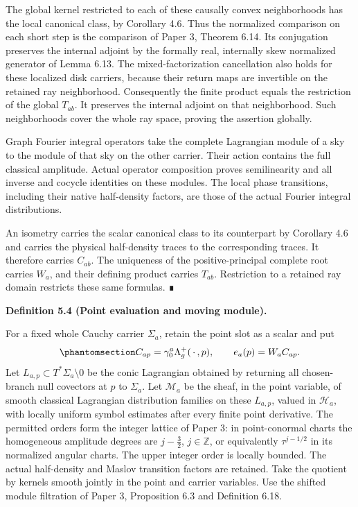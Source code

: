\documentclass[
  english,
  11pt,
  reqno]{amsart}
\makeatletter
\newcommand{\pandocstatementheading}[1]{%
  \par\addpenalty{\@beginparpenalty}%
  \addvspace{.5\baselineskip plus .2\baselineskip minus .2\baselineskip}%
  {\normalfont\bfseries #1\par}%
  \nobreak\@afterindenttrue\@afterheading
}
\makeatother
\begin{document}
The global kernel restricted to each of these causally convex
neighborhoods has the local canonical class, by Corollary 4.6. Thus the
normalized comparison on each short step is the comparison of Paper 3,
Theorem 6.14. Its conjugation preserves the internal adjoint by the
formally real, internally skew normalized generator of Lemma 6.13. The
mixed-factorization cancellation also holds for these localized disk
carriers, because their return maps are invertible on the retained ray
neighborhood. Consequently the finite product equals the restriction of
the global \(T_{ab}\). It preserves the internal adjoint on that
neighborhood. Such neighborhoods cover the whole ray space, proving the
assertion globally.

Graph Fourier integral operators take the complete Lagrangian module of
a sky to the module of that sky on the other carrier. Their action
contains the full classical amplitude. Actual operator composition
proves semilinearity and all inverse and cocycle identities on these
modules. The local phase transitions, including their native
half-density factors, are those of the actual Fourier integral
distributions.

An isometry carries the scalar canonical class to its counterpart by
Corollary 4.6 and carries the physical half-density traces to the
corresponding traces. It therefore carries \(C_{ab}\). The uniqueness of
the positive-principal complete root carries \(W_a\), and their defining
product carries \(T_{ab}\). Restriction to a retained ray domain
restricts these same formulas. ∎

\pandocstatementheading{\protect{}\label{def:global-point-evaluation}Definition 5.4 (Point evaluation and moving module).}

For a fixed whole Cauchy carrier \(\Sigma_a\), retain the point slot as
a scalar and put
\begin{equation}\protect\phantomsection\label{eq:global-point-evaluation}{
C_{ap}=\gamma_0^a\Lambda_g^+(\,\cdot\,,p),
\qquad e_a(p)=W_aC_{ap}.
}\end{equation} Let \(L_{a,p}\subset T^*\Sigma_a\setminus0\) be the
conic Lagrangian obtained by returning all chosen-branch null covectors
at \(p\) to \(\Sigma_a\). Let \(\mathscr M_a\) be the sheaf, in the
point variable, of smooth classical Lagrangian distribution families on
these \(L_{a,p}\), valued in \(\mathcal H_a\), with locally uniform
symbol estimates after every finite point derivative. The permitted
orders form the integer lattice of Paper 3: in point-conormal charts the
homogeneous amplitude degrees are \(j-\tfrac32\), \(j\in\mathbb Z\), or
equivalently \(\tau^{j-1/2}\) in its normalized angular charts. The
upper integer order is locally bounded. The actual half-density and
Maslov transition factors are retained. Take the quotient by kernels
smooth jointly in the point and carrier variables. Use the shifted
module filtration of Paper 3, Proposition 6.3 and Definition 6.18.
\end{document}

